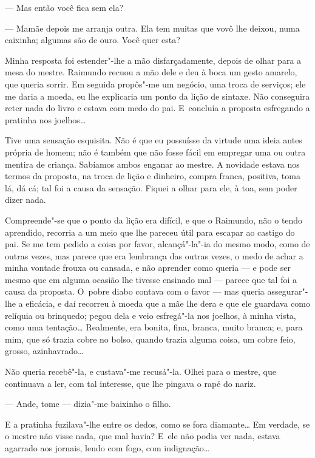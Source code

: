\begin{linenumbers}
--- Mas então você fica sem ela?

--- Mamãe depois me arranja outra. Ela tem muitas que vovô lhe deixou,
numa caixinha; algumas são de ouro. Você quer esta?

Minha resposta foi estender"-lhe a mão disfarçadamente, depois de olhar
para a mesa do mestre. Raimundo recuou a mão dele e deu à boca um gesto
amarelo, que queria sorrir. Em seguida propôs"-me um negócio, uma troca
de serviços; ele me daria a moeda, eu lhe explicaria um ponto da lição
de sintaxe. Não conseguira reter nada do livro e estava com medo do pai.
E~concluía a proposta esfregando a pratinha nos joelhos\ldots{}

Tive uma sensação esquisita. Não é que eu possuísse da virtude uma ideia
antes própria de homem; não é também que não fosse fácil em empregar uma
ou outra mentira de criança. Sabíamos ambos enganar ao mestre. A
novidade estava nos termos da proposta, na troca de lição e dinheiro,
compra franca, positiva, toma lá, dá cá; tal foi a causa da sensação.
Fiquei a olhar para ele, à toa, sem poder dizer nada.

Compreende"-se que o ponto da lição era difícil, e que o Raimundo, não o
tendo aprendido, recorria a um meio que lhe pareceu útil para escapar ao
castigo do pai. Se me tem pedido a coisa por favor, alcançá"-la"-ia do
mesmo modo, como de outras vezes, mas parece que era lembrança das
outras vezes, o medo de achar a minha vontade frouxa ou cansada, e não
aprender como queria --- e pode ser mesmo que em alguma ocasião lhe
tivesse ensinado mal --- parece que tal foi a causa da proposta. O~pobre
diabo contava com o favor --- mas queria assegurar"-lhe a eficácia, e daí
recorreu à moeda que a mãe lhe dera e que ele guardava como relíquia ou
brinquedo; pegou dela e veio esfregá"-la nos joelhos, à minha vista, como
uma tentação\ldots{} Realmente, era bonita, fina, branca, muito branca; e,
para mim, que só trazia cobre no bolso, quando trazia alguma coisa, um
cobre feio, grosso, azinhavrado\ldots{}

Não queria recebê"-la, e custava"-me recusá"-la. Olhei para o mestre, que
continuava a ler, com tal interesse, que lhe pingava o rapé do nariz.

--- Ande, tome --- dizia"-me baixinho o filho.

E a pratinha fuzilava"-lhe entre os dedos, como se fora diamante\ldots{} Em
verdade, se o mestre não visse nada, que mal havia? E~ele não podia ver
nada, estava agarrado aos jornais, lendo com fogo, com indignação\ldots{}


\end{linenumbers}
